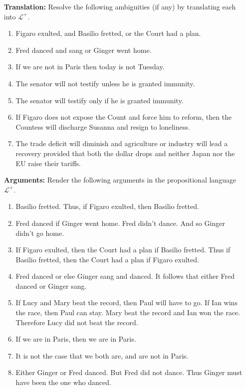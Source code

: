 \documentclass[a4paper, 11pt]{article} %
\renewcommand{\L}[0]{\mathcal{L}}
\begin{document}
\begin{enumerate}[leftmargin=1.2in,labelsep=.15in] 
\item[\bf Translation:] Resolve the following ambiguities (if any) by translating each into $\L^+$.
	\begin{enumerate}[label=(\arabic*)]\small
	\item Figaro exulted, and Basilio fretted, or the Court had a plan.
	\item Fred danced and sang or Ginger went home.
	\item If we are not in Paris then today is not Tuesday.
	\item The senator will not testify unless he is granted immunity.
	\item The senator will testify only if he is granted immunity.
	\item If Figaro does not expose the Count and force him to reform, then the Countess will discharge Susanna and resign to loneliness.
	\item The trade deficit will diminish and agriculture or industry will lead a recovery provided that both the dollar drops and neither Japan nor the EU raise their tariffs.
	\end{enumerate}
\item[\bf Arguments:] Render the following arguments in the propositional language $\L^+$.
	\begin{enumerate}[label=(\arabic*)]\small
	\item Basilio fretted. Thus, if Figaro exulted, then Basilio fretted.
	\item Fred danced if Ginger went home. Fred didn't dance. And so Ginger didn't go home.
	\item If Figaro exulted, then the Court had a plan if Basilio fretted. Thus if Basilio fretted, then the Court had a plan if Figaro exulted.
	\item Fred danced or else Ginger sang and danced. It follows that either Fred danced or Ginger sang.
	\item If Lucy and Mary beat the record, then Paul will have to go. If Ian wins the race, then Paul can stay. Mary beat the record and Ian won the race. Therefore Lucy did not beat the record.
	\item If we are in Paris, then we are in Paris.
	\item It is not the case that we both are, and are not in Paris.
	\item Either Ginger or Fred danced. But Fred did not dance. Thus Ginger must have been the one who danced.

\end{enumerate}
\end{enumerate}
\end{document}
